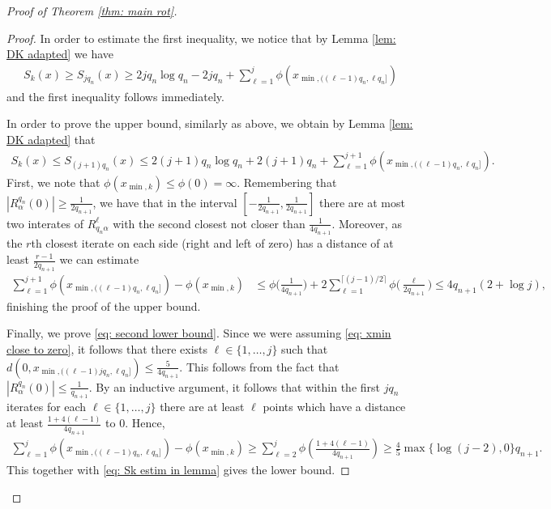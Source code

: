 \documentclass[11pt]{amsart}
\theoremstyle{definition}
\numberwithin{equation}{section}
\begin{document}
\begin{proof}[Proof of Theorem \ref{thm: main rot}]
\begin{proof}
 
 In order to estimate the first inequality, we notice that by Lemma \ref{lem: DK adapted} we have 
 \begin{align}
  S_k(x)\geq S_{jq_n}(x)\geq 2jq_n\log q_n-2jq_n+\sum_{\ell=1}^j \phi(x_{\min,((\ell-1)q_n, \ell q_n]})\label{eq: Sk estim in lemma}
 \end{align}
 and the first inequality follows immediately.
 
 
 In order to prove the upper bound,
similarly as above, we obtain by Lemma \ref{lem: DK adapted} that 
\begin{align*}
   S_k(x)\leq S_{(j+1)q_n}(x)\leq 2(j+1)q_n\log q_n+2(j+1)q_n+\sum_{\ell=1}^{j+1} \phi(x_{\min,((\ell-1)q_n, \ell q_n]}).
\end{align*}
First, we note that $\phi(x_{\min,k})\leq \phi(0)=\infty$.
Remembering that $|R_{\alpha}^{q_n}(0)|\geq \frac{1}{2q_{n+1}}$, 
we have that in the interval $[-\frac{1}{2q_{n+1}}, \frac{1}{2q_{n+1}}]$ there are at most two interates of $R_{q_n\alpha}^{\ell}$ with the second closest not closer than $\frac{1}{4q_{n+1}}$. Moreover, as the $r$th closest iterate on each side (right and left of zero) has a distance of at least $\frac{r-1}{2q_{n+1}}$ we can estimate 
\begin{align*}
 \sum_{\ell=1}^{j+1} \phi(x_{\min,((\ell-1)q_n, \ell q_n]})-\phi(x_{\min, k})
 &\leq \phi\Big(\frac{1}{4q_{n+1}}\Big)+
 2\sum_{\ell=1}^{\lceil (j-1)/2\rceil} \phi\Big(\frac{\ell}{2q_{n+1}}\Big)
 \leq 4q_{n+1}(2+\log j),
\end{align*}
 finishing the proof of the upper bound.
 
 Finally, we prove \eqref{eq: second lower bound}. Since we were assuming \eqref{eq: xmin close to zero}, it follows that there exists $\ell\in \{1,\ldots, j\}$ such that $d(0, x_{\min, ((\ell-1)jq_n, \ell q_n]})\leq \frac{5}{4q_{n+1}}$. This follows from the fact that $|R_{\alpha}^{q_n}(0)|\leq \frac{1}{q_{n+1}}$. 
By an inductive argument, it follows that within the first $jq_n$ iterates for each $\ell\in \{1,\ldots, j\}$ there are at least $\ell$ points which have a distance at least $\frac{1+4 (\ell-1)}{4q_{n+1}}$ to $0$. 
Hence,
\begin{align*}
 \sum_{\ell=1}^j \phi(x_{\min,((\ell-1)q_n, \ell q_n]})- \phi(x_{\min, k})
 \geq \sum_{\ell=2}^j \phi \left(\frac{1+4 (\ell-1)}{4q_{n+1}}\right)
 \geq \frac{4}{5}\max\{\log (j-2),0\} q_{n+1}.
\end{align*}
This together with \eqref{eq: Sk estim in lemma} gives the lower bound.
\end{proof}



\end{proof}
\end{document}

